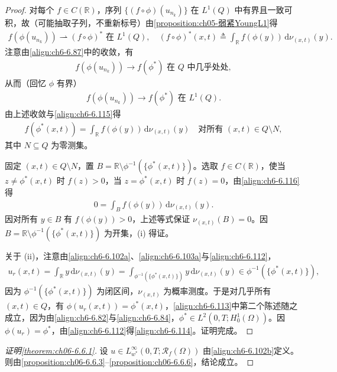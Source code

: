 \documentclass[../../main.tex]{subfiles}%
\begin{document}
\begin{proof}
对每个 $f\in C(\mathbb{R})$，序列 $\{(f\circ\phi)(u_{n_k})\}$ 在 $L^1(Q)$ 中有界且一致可积，故（可能抽取子列，不重新标号）由\cref{proposition:ch05-弱紧YoungL1}得
\begin{align}
f(\phi(u_{n_k}))\rightharpoonup(f\circ\phi)^* \text{ 在 }L^1(Q),\quad
(f\circ\phi)^*(x,t)\triangleq \int_\mathbb{R}f(\phi(y))\,\mathrm{d}\nu_{(x,t)}(y). \label{align:ch6-6.115}
\end{align}
注意由\eqref{align:ch6-6.87}中的收敛，有
\begin{align*}
f(\phi(u_{n_k}))\to f(\phi^*) \text{ 在 }Q\text{ 中几乎处处},
\end{align*}
从而（回忆 $\phi$ 有界）
\begin{align*}
f(\phi(u_{n_k}))\to f(\phi^*) \text{ 在 }L^1(Q).
\end{align*}
由上述收敛与\eqref{align:ch6-6.115}得
\begin{align}
f(\phi^*(x,t))=\int_\mathbb{R}f(\phi(y))\,\mathrm{d}\nu_{(x,t)}(y)
\quad\text{对所有 }(x,t)\in Q\setminus N, \label{align:ch6-6.116}
\end{align}
其中 $N\subseteq Q$ 为零测集。

固定 $(x,t)\in Q\setminus N$，置 $B=\mathbb{R}\setminus\phi^{-1}(\{\phi^*(x,t)\})$。选取 $f\in C(\mathbb{R})$，使当 $z\neq\phi^*(x,t)$ 时 $f(z)>0$，当 $z=\phi^*(x,t)$ 时 $f(z)=0$，由\eqref{align:ch6-6.116}得
\begin{align*}
0=\int_B f(\phi(y))\,\mathrm{d}\nu_{(x,t)}(y).
\end{align*}
因对所有 $y\in B$ 有 $f(\phi(y))>0$，上述等式保证 $\nu_{(x,t)}(B)=0$。因 $B=\mathbb{R}\setminus\phi^{-1}(\{\phi^*(x,t)\})$ 为开集，(i) 得证。

关于 (ii)，注意由\eqref{align:ch6-6.102a}、\eqref{align:ch6-6.103a}与\eqref{align:ch6-6.112}，
\begin{align*}
u_r(x,t)=\int_\mathbb{R}y\,\mathrm{d}\nu_{(x,t)}(y)
=\int_{\phi^{-1}(\{\phi^*(x,t)\})}y\,\mathrm{d}\nu_{(x,t)}(y)
\in\phi^{-1}(\{\phi^*(x,t)\}),
\end{align*}
因为 $\phi^{-1}(\{\phi^*(x,t)\})$ 为闭区间，$\nu_{(x,t)}$ 为概率测度。于是对几乎所有 $(x,t)\in Q$，有 $\phi(u_r(x,t))=\phi^*(x,t)$，\eqref{align:ch6-6.113}中第二个陈述随之成立，因为由\eqref{align:ch6-6.82}与\eqref{align:ch6-6.84}，$\phi^*\in L^2(0,T;H^1_0(\Omega))$。因 $\phi(u_r)=\phi^*$，由\eqref{align:ch6-6.112}得\eqref{align:ch6-6.114}。证明完成。
\end{proof}

\begin{proof}[证明\cref{theorem:ch06-6.6.1}]
设 $u\in L^\infty_{w^*}(0,T;\mathscr{R}_f(\Omega))$ 由\eqref{align:ch6-6.102b}定义。则由\cref{proposition:ch06-6.6.3}--\cref{proposition:ch06-6.6.6}，结论成立。
\end{proof}
\end{document}
